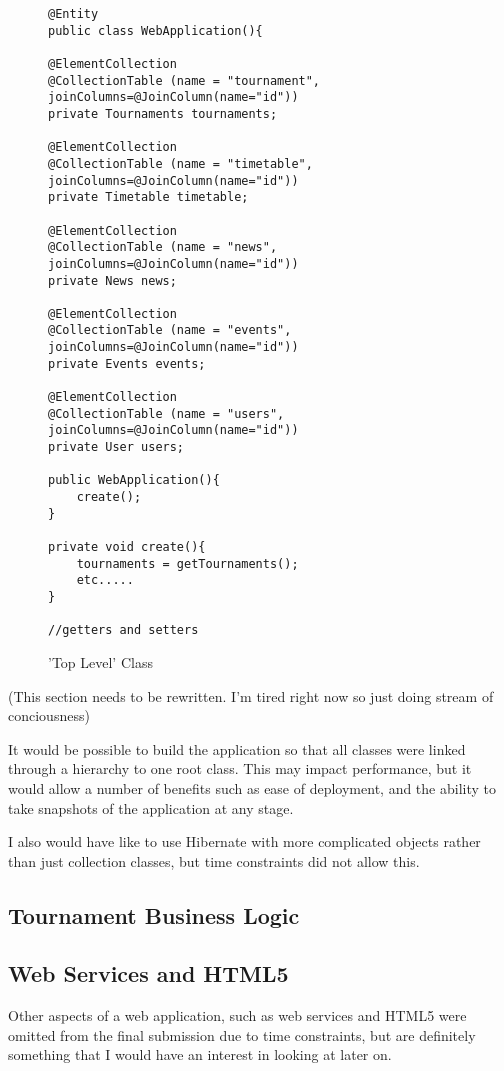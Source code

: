 \begin{figure}[H]
\begin{lstlisting}
@Entity
public class WebApplication(){

@ElementCollection
@CollectionTable (name = "tournament", joinColumns=@JoinColumn(name="id"))
private Tournaments tournaments;

@ElementCollection
@CollectionTable (name = "timetable", joinColumns=@JoinColumn(name="id"))
private Timetable timetable;

@ElementCollection
@CollectionTable (name = "news", joinColumns=@JoinColumn(name="id"))
private News news;

@ElementCollection
@CollectionTable (name = "events", joinColumns=@JoinColumn(name="id"))
private Events events;

@ElementCollection
@CollectionTable (name = "users", joinColumns=@JoinColumn(name="id"))
private User users;

public WebApplication(){
	create();
}

private void create(){
	tournaments = getTournaments();
	etc.....
}

//getters and setters

\end{lstlisting}
\caption{'Top Level' Class}
\label{fig:toplevel}
\end{figure}

(This section needs to be rewritten. I'm tired right now so just doing stream of conciousness) 

It would be possible to build the application so that all classes were linked through a hierarchy to one root class. This may impact performance, but it would allow a number of benefits such as ease of deployment, and the ability to take snapshots of the application at any stage.

I also would have like to use Hibernate with more complicated objects rather than just collection classes, but time constraints did not allow this.

\subsection{Tournament Business Logic}

\subsection{Web Services and HTML5}
Other aspects of a web application, such as web services and HTML5 were omitted from the final submission due to time constraints, but are definitely something that I would have an interest in looking at later on.
